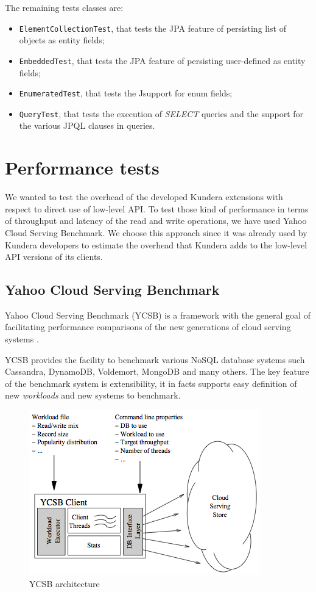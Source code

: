 \newparagraph The remaining tests classes are:
\begin{itemize}
\item \texttt{ElementCollectionTest}, that tests the JPA feature of persisting list of objects as entity fields;
\item \texttt{EmbeddedTest}, that tests the JPA feature of persisting user-defined as entity fields;
\item \texttt{EnumeratedTest}, that tests the Jsupport for enum fields;
\item \texttt{QueryTest}, that tests the execution of \textit{SELECT} queries and the support for the various JPQL clauses in queries.
\end{itemize}

\section{Performance tests}
\label{sec:performance}
We wanted to test the overhead of the developed Kundera extensions with respect to direct use of low-level API. To test those kind of performance in terms of throughput and latency of the read and write operations, we have used Yahoo Cloud Serving Benchmark.
We choose this approach since it was already used by Kundera developers to estimate the overhead that Kundera adds to the low-level API versions of its clients.

\subsection{Yahoo Cloud Serving Benchmark}
Yahoo Cloud Serving Benchmark (YCSB) is a framework with the general goal of facilitating performance comparisons of the new generations of cloud serving systems \cite{paper:ycsb}.

\noindent YCSB provides the facility to benchmark various NoSQL database systems such Cassandra, DynamoDB, Voldemort, MongoDB and many others.
The key feature of the benchmark system is extensibility, it in facts supports easy definition of new \textit{workloads} and new systems to benchmark.

\begin{figure}[tbh]
  \centering
  \includegraphics[width=10cm]{images/ycsb_architecture}
  \caption{YCSB architecture \cite{paper:ycsb}}
  \label{fig:ycsb-architecture}
\end{figure} 

